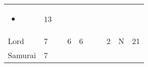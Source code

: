 \documentclass[12pt]{article}
\newcommand{\indexClass}[1]{\index{#1}}
\newcommand{\class}[1]{#1\indexClass{#1}}
\begin{document}
\begin{longtable}[]{@{}llllllllll@{}}
\begin{minipage}[t]{0.07\columnwidth}\raggedright\strut
\begin{itemize}
\item
\end{itemize}
\strut\end{minipage} &
\begin{minipage}[t]{0.08\columnwidth}\raggedright\strut
13
\strut\end{minipage}\tabularnewline
\begin{minipage}[t]{0.13\columnwidth}\raggedright\strut
\class{Lord}
\strut\end{minipage} &
\begin{minipage}[t]{0.06\columnwidth}\raggedright\strut
7
\strut\end{minipage} &
\begin{minipage}[t]{0.06\columnwidth}\raggedright\strut
\strut\end{minipage} &
\begin{minipage}[t]{0.06\columnwidth}\raggedright\strut
6
\strut\end{minipage} &
\begin{minipage}[t]{0.06\columnwidth}\raggedright\strut
6
\strut\end{minipage} &
\begin{minipage}[t]{0.06\columnwidth}\raggedright\strut
\strut\end{minipage} &
\begin{minipage}[t]{0.06\columnwidth}\raggedright\strut
\strut\end{minipage} &
\begin{minipage}[t]{0.06\columnwidth}\raggedright\strut
2
\strut\end{minipage} &
\begin{minipage}[t]{0.07\columnwidth}\raggedright\strut
N
\strut\end{minipage} &
\begin{minipage}[t]{0.08\columnwidth}\raggedright\strut
21
\strut\end{minipage}\tabularnewline
\begin{minipage}[t]{0.13\columnwidth}\raggedright\strut
\class{Samurai}
\strut\end{minipage} &
\begin{minipage}[t]{0.06\columnwidth}\raggedright\strut
7
\strut\end{minipage} &
\begin{minipage}[t]{0.06\columnwidth}\raggedright\strut
\strut\end{minipage} &

\end{longtable}
\end{document}
